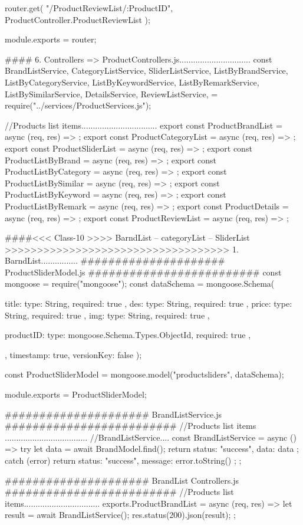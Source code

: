 router.get(
  "/ProductReviewList/:ProductID",
  ProductController.ProductReviewList
);

module.exports = router;

#### 6. Controllers =>  ProductControllers.js...............................
const {
  BrandListService,
  CategoryListService,
  SliderListService,
  ListByBrandService,
  ListByCategoryService,
  ListByKeywordService,
  ListByRemarkService,
  ListBySimilarService,
  DetailsService,
  ReviewListService,
} = require("../services/ProductServices.js");

//Products list items.................................
     export const ProductBrandList = async (req, res) => {};
     export const ProductCategoryList = async (req, res) => {};
     export const ProductSliderList = async (req, res) => {};
     export const ProductListByBrand = async (req, res) => {};
     export const ProductListByCategory = async (req, res) => {};
     export const ProductListBySimilar = async (req, res) => {};
     export const ProductListByKeyword = async (req, res) => {};
     export const ProductListByRemark = async (req, res) => {};
     export const ProductDetails = async (req, res) => {};
     export const ProductReviewList = async (req, res) => {};

####<<< Class-10 >>>> BarndList -- categoryList -- SliderList >>>>>>>>>>>>>>>>>>>>>>>>>>>>>>>>>>>
1. BarndList................
##################### ProductSliderModel.js #########################
const mongoose = require("mongoose");
const dataSchema = mongoose.Schema(
  {
    title: { type: String, required: true },
    des: { type: String, required: true },
    price: { type: String, required: true },
    img: { type: String, required: true },

    productID: { type: mongoose.Schema.Types.ObjectId, required: true },
  },
  { timestamp: true, versionKey: false }
);

const ProductSliderModel = mongoose.model("productsliders", dataSchema);

module.exports = ProductSliderModel;

##################### BrandListService.js #########################
//Products list items ....................................
//BrandListService....
const BrandListService = async () => {
  try {
    let data = await BrandModel.find();
    return { status: "success", data: data };
  } catch (error) {
    return { status: "success", message: error.toString() };
  }
};

##################### BrandList Controllers.js #########################
//Products list items.................................
exports.ProductBrandList = async (req, res) => {
  let result = await BrandListService();
  res.status(200).json(result);
};

